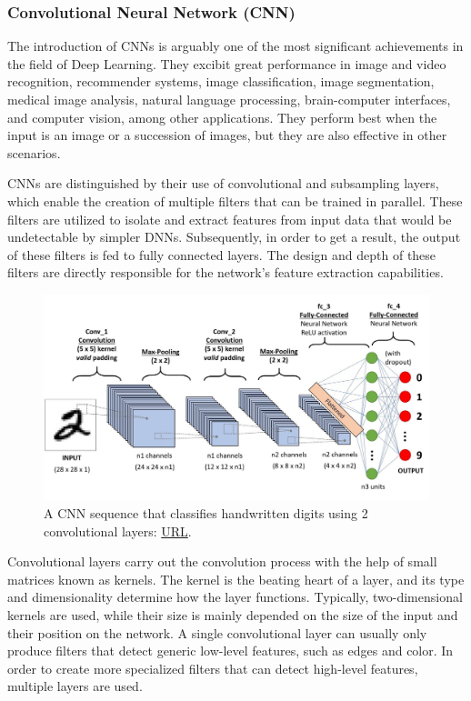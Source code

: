 \subsubsection{Convolutional Neural Network (CNN)}
The introduction of CNNs\cite{CS231n_stanford_cnn} is arguably one of the most significant achievements in the field of Deep Learning. They excibit great performance in image and video recognition, recommender systems, image classification, image segmentation, medical image analysis, natural language processing, brain-computer interfaces, and computer vision, among other applications. They perform best when the input is an image or a succession of images, but they are also effective in other scenarios.

CNNs are distinguished by their use of convolutional and subsampling layers, which enable the creation of multiple filters that can be trained in parallel. These filters are utilized to isolate and extract features from input data that would be undetectable by simpler DNNs. Subsequently, in order to get a result, the output of these filters is fed to fully connected layers. The design and depth of these filters are directly responsible for the network's feature extraction capabilities.

\begin{figure}[H]
    \centering
        \includegraphics[width=1\textwidth]{Images/ANNArchitectures/cnn_2conv_layers.jpg}
        \decoRule
        \caption[A CNN sequence to classify handwritten digits]{A CNN sequence that classifies handwritten digits using 2 convolutional layers: \href{https://towardsdatascience.com/a-comprehensive-guide-to-convolutional-neural-networks-the-eli5-way-3bd2b1164a53}{URL}.}
        \label{fig:A CNN sequence to classify handwritten digits}
\end{figure}

Convolutional layers carry out the convolution process with the help of small matrices known as kernels. The kernel is the beating heart of a layer, and its type and dimensionality determine how the layer functions. Typically, two-dimensional kernels are used, while their size is mainly depended on the size of the input and their position on the network. A single convolutional layer can usually only produce filters that detect generic low-level features, such as edges and color. In order to create more specialized filters that can detect high-level features, multiple layers are used.

